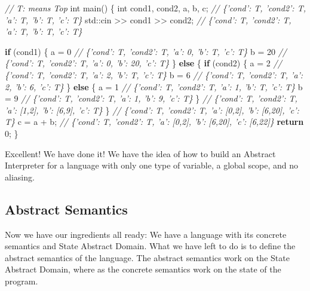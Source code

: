 \documentclass[
11pt, %
english, %
singlespacing, %
headsepline, %
]{MastersDoctoralThesis} %
\newenvironment{Shaded}{}{}
\newcommand{\BuiltInTok}[1]{#1}
\newcommand{\CommentTok}[1]{\textcolor[rgb]{0.38,0.63,0.69}{\textit{#1}}}
\newcommand{\ControlFlowTok}[1]{\textcolor[rgb]{0.00,0.44,0.13}{\textbf{#1}}}
\newcommand{\DataTypeTok}[1]{\textcolor[rgb]{0.56,0.13,0.00}{#1}}
\newcommand{\DecValTok}[1]{\textcolor[rgb]{0.25,0.63,0.44}{#1}}
\newcommand{\NormalTok}[1]{#1}
\begin{document}
\begin{Shaded}
\begin{Highlighting}[]
\CommentTok{// T: means Top}
\DataTypeTok{int}\NormalTok{ main() \{}
  \DataTypeTok{int}\NormalTok{ cond1, cond2, a, b, c;}
  \CommentTok{// \{'cond': T, 'cond2': T, 'a': T, 'b': T, 'c': T\}}
  \BuiltInTok{std::}\NormalTok{cin >> cond1 >> cond2;}
  \CommentTok{// \{'cond': T, 'cond2': T, 'a': T, 'b': T, 'c': T\}}

  \ControlFlowTok{if}\NormalTok{ (cond1) \{}
\NormalTok{    a = }\DecValTok{0}
    \CommentTok{// \{'cond': T, 'cond2': T, 'a': 0, 'b': T, 'c': T\}}
\NormalTok{    b = }\DecValTok{20}
    \CommentTok{// \{'cond': T, 'cond2': T, 'a': 0, 'b': 20, 'c': T\}}
\NormalTok{  \} }\ControlFlowTok{else}\NormalTok{ \{}
    \ControlFlowTok{if}\NormalTok{ (cond2) \{}
\NormalTok{      a = }\DecValTok{2}
      \CommentTok{// \{'cond': T, 'cond2': T, 'a': 2, 'b': T, 'c': T\}}
\NormalTok{      b = }\DecValTok{6}
      \CommentTok{// \{'cond': T, 'cond2': T, 'a': 2, 'b': 6, 'c': T\}}
\NormalTok{    \} }\ControlFlowTok{else}\NormalTok{ \{}
\NormalTok{      a = }\DecValTok{1}
      \CommentTok{// \{'cond': T, 'cond2': T, 'a': 1, 'b': T, 'c': T\}}
\NormalTok{      b = }\DecValTok{9}
      \CommentTok{// \{'cond': T, 'cond2': T, 'a': 1, 'b': 9, 'c': T\}}
\NormalTok{    \}}
    \CommentTok{// \{'cond': T, 'cond2': T, 'a': [1,2], 'b': [6,9], 'c': T\}}
\NormalTok{  \}}
  \CommentTok{// \{'cond': T, 'cond2': T, 'a': [0,2], 'b': [6,20], 'c': T\}}
\NormalTok{  c = a + b;}
  \CommentTok{// \{'cond': T, 'cond2': T, 'a': [0,2], 'b': [6,20], 'c': [6,22]\}}
  \ControlFlowTok{return} \DecValTok{0}\NormalTok{;}
\NormalTok{\}}
\end{Highlighting}
\end{Shaded}

Excellent! We have done it! We have the idea of how to build an Abstract
Interpreter for a language with only one type of variable, a global
scope, and no aliasing.

\hypertarget{abstract-semantics}{%
\subsection{Abstract Semantics}\label{abstract-semantics}}

Now we have our ingredients all ready: We have a language with its
concrete semantics and State Abstract Domain. What we have left to do is
to define the abstract semantics of the language. The abstract semantics
work on the State Abstract Domain, where as the concrete semantics work
on the state of the program.
\end{document}
